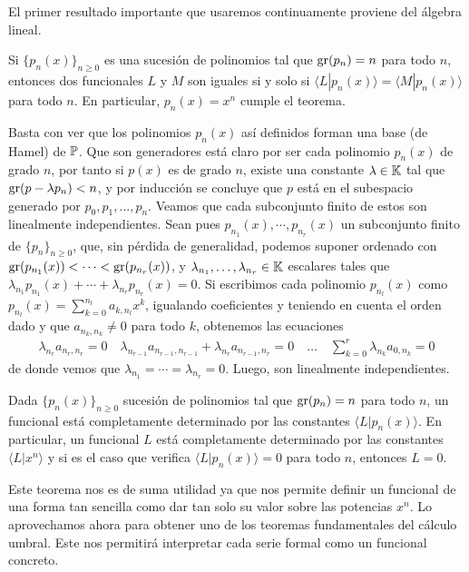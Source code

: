 El primer resultado importante que usaremos continuamente proviene del álgebra lineal.
\begin{teorema}
    Si $\{p_n(x)\}_{n\geq0}$ es una sucesión de polinomios tal que $\operatorname{gr}(p_n) = n$ para todo $n$, entonces dos funcionales $L$ y $M$ son iguales si y solo si $\langle L | p_n(x) \rangle = \langle  M | p_n(x) \rangle$ para todo $n$. En particular, $p_n(x) = x^n$ cumple el teorema.
\end{teorema}
\begin{demo}
    Basta con ver que los polinomios $p_n(x)$ así definidos forman una base (de Hamel) de $\mathbb{P}$. Que son generadores está claro por ser cada polinomio $p_n(x)$ de grado $n$, por tanto si $p(x)$ es de grado $n$, existe una constante $\lambda \in \mathbb{K}$ tal que $\operatorname{gr}(p - \lambda p_{n}) < n$, y por inducción se concluye que $p$ está en el subespacio generado por $p_{0}, p_{1}, \dots, p_{n}$. Veamos que cada subconjunto finito de estos son linealmente independientes. Sean pues $p_{n_1}(x), \cdots , p_{n_r}(x)$ un subconjunto finito de $\{p_n\}_{n\geq0}$, que, sin pérdida de generalidad, podemos suponer ordenado con $\operatorname{gr}(p_{n_1}(x)) < \dots < \operatorname{gr}(p_{n_r}(x))$, y $\lambda_{n_1}, \dots , \lambda_{n_r} \in \mathbb{K}$ escalares tales que $\lambda_{n_1}p_{n_1}(x) + \cdots + \lambda_{n_r}p_{n_r}(x) = 0$. Si escribimos cada polinomio $p_{n_l}(x)$ como $p_{n_l}(x) = \sum_{k=0}^{n_l}a_{k,n_l}x^k$, igualando coeficientes y teniendo en cuenta el orden dado y que $a_{n_k,n_k} \neq 0$ para todo $k$, obtenemos las ecuaciones
    \begin{align*}
        \lambda_{n_r}a_{n_r,n_r} = 0 \quad \lambda_{n_{r-1}}a_{n_{r-1},n_{r-1}} + \lambda_{n_r}a_{n_{r-1},n_r} = 0 \quad \dots \quad \sum_{k=0}^r\lambda_{n_k}a_{0,n_k} = 0
    \end{align*}
    de donde vemos que $\lambda_{n_1} = \cdots = \lambda_{n_r} = 0$. Luego, son linealmente independientes.
\end{demo}
\begin{corolario}\label{spanning argument}
    Dada $\{p_n(x)\}_{n\geq0}$ sucesión de polinomios tal que $\operatorname{gr}(p_n) = n$ para todo $n$, un funcional está completamente determinado por las constantes $\langle L | p_n(x) \rangle$. En particular, un funcional $L$ está completamente determinado por las constantes $\langle L | x^n \rangle$ y si es el caso que verifica $\langle L | p_n(x) \rangle = 0$ para todo $n$, entonces $L = 0$.
\end{corolario}
Este teorema nos es de suma utilidad ya que nos permite definir un funcional de una forma tan sencilla como dar tan solo su valor sobre las potencias $x^n$. Lo aprovechamos ahora para obtener uno de los teoremas fundamentales del cálculo umbral. Este nos permitirá interpretar cada serie formal como un funcional concreto.

